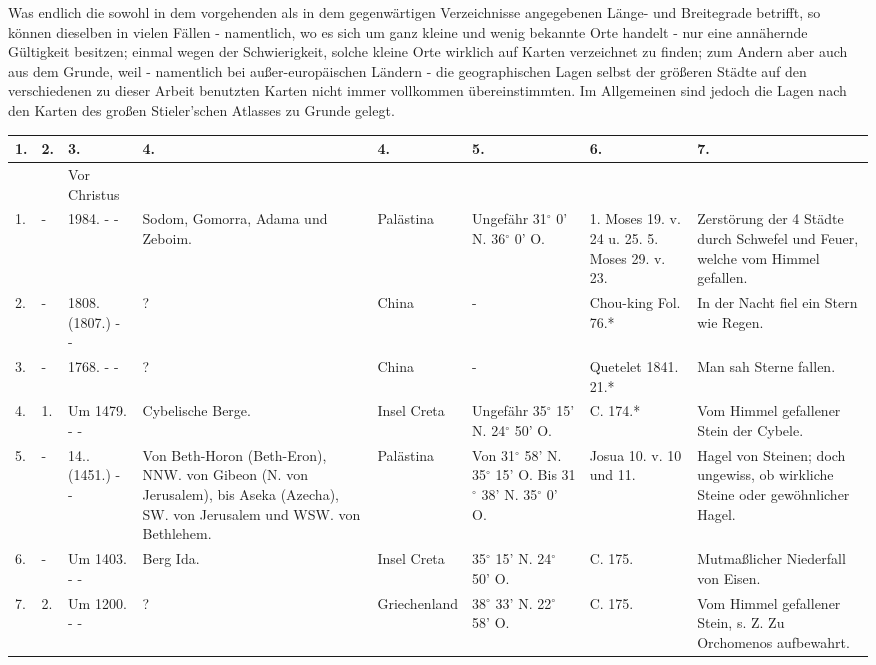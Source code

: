 \documentclass[a4paper, 11pt, oneside, polutonikogreek, german]{article}
\begin{document}
Was endlich die sowohl in dem vorgehenden als in dem gegenwärtigen Verzeichnisse angegebenen Länge- und Breitegrade betrifft, so können dieselben in vielen Fällen - namentlich, wo es sich um ganz kleine und wenig bekannte Orte handelt - nur eine annähernde Gültigkeit besitzen; einmal wegen der Schwierigkeit, solche kleine Orte wirklich auf Karten verzeichnet zu finden; zum Andern aber auch aus dem Grunde, weil - namentlich bei außer-europäischen Ländern - die geographischen Lagen selbst der größeren Städte auf den verschiedenen zu dieser Arbeit benutzten Karten nicht immer vollkommen übereinstimmten. Im Allgemeinen sind jedoch die Lagen nach den Karten des großen Stieler'schen Atlasses zu Grunde gelegt.
\clearpage
\begin{table}[!ht]
    \centering
    \begin{tabular}{|l|l|l|l|l|l|l|l|}
    \hline
        1. & 2. & 3. & 4. & 4. & 5. & 6. & 7. \\ \hline
          &   & Vor Christus &   &   &   &   &   \\ \hline
        1. & - & 1984. - - & Sodom, Gomorra, Adama und Zeboim. & Palästina & Ungefähr 31$^\circ$ 0' N. 36$^\circ$ 0' O. & 1. Moses 19. v. 24 u. 25. 5. Moses 29. v. 23. & Zerstörung der 4 Städte durch Schwefel und Feuer, welche vom Himmel gefallen. \\ \hline
        2. & - & 1808. (1807.) - - & ? & China & - & Chou-king Fol. 76.* & In der Nacht fiel ein Stern wie Regen. \\ \hline
        3. & - & 1768. - - & ? & China & - & Quetelet 1841. 21.* & Man sah Sterne fallen. \\ \hline
        4. & 1. & Um 1479. - - & Cybelische Berge. & Insel Creta & Ungefähr 35$^\circ$ 15' N. 24$^\circ$ 50' O. & C. 174.* & Vom Himmel gefallener Stein der Cybele. \\ \hline
        5. & - & 14.. (1451.) - - & Von Beth-Horon (Beth-Eron), NNW. von Gibeon (N. von Jerusalem), bis Aseka (Azecha), SW. von Jerusalem und WSW. von Bethlehem. & Palästina & Von 31$^\circ$ 58' N. 35$^\circ$ 15' O. Bis 31$^\circ$ 38' N. 35$^\circ$ 0' O. & Josua 10. v. 10 und 11. & Hagel von Steinen; doch ungewiss, ob wirkliche Steine oder gewöhnlicher Hagel. \\ \hline
        6. & - & Um 1403. - - & Berg Ida. & Insel Creta & 35$^\circ$ 15' N. 24$^\circ$ 50' O. & C. 175. & Mutmaßlicher Niederfall von Eisen. \\ \hline
        7. & 2. & Um 1200. - - & ? & Griechenland & 38$^\circ$ 33' N. 22$^\circ$ 58' O. & C. 175. & Vom Himmel gefallener Stein, s. Z. Zu Orchomenos aufbewahrt. \\ \hline

\end{tabular}
\end{table}
\end{document}
